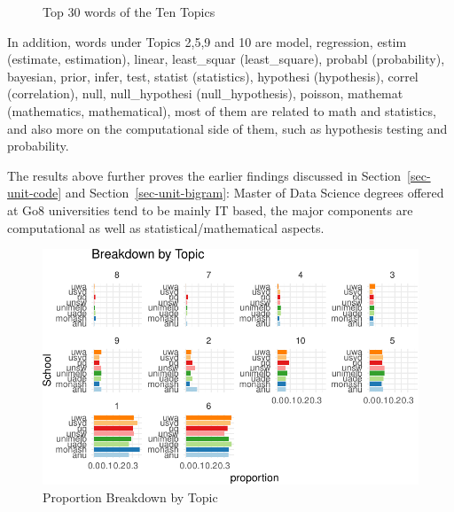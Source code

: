 \documentclass[
  letterpaper,
]{report}
\begin{document}
\begin{figure}
{\begin{table}
\begin{tabular}{>{}l|>{}l|>{}l|>{}l|>{}l|>{}l|>{}l|>{}l|>{}l|>{}l}
\hline
\cellcolor[HTML]{A6CEE3}{\textcolor{white}{method}} & \cellcolor[HTML]{1F78B4}{\textcolor{white}{independ\_variabl}} & \cellcolor[HTML]{B2DF8A}{\textcolor{white}{differ}} & \cellcolor[HTML]{33A02C}{\textcolor{white}{pr}} & \cellcolor[HTML]{FB9A99}{\textcolor{white}{first}} & \cellcolor[HTML]{E31A1C}{\textcolor{white}{spatial}} & \cellcolor[HTML]{FDBF6F}{\textcolor{white}{random}} & \cellcolor[HTML]{FF7F00}{\textcolor{white}{w\_}} & \cellcolor[HTML]{CAB2D6}{\textcolor{white}{fals}} & \cellcolor[HTML]{6A3D9A}{\textcolor{white}{t\_}}\\
\hline
\end{tabular}
\endgroup{}
\end{table}

}

\caption{\label{fig-topics}Top 30 words of the Ten Topics}

\end{figure}

In addition, words under Topics 2,5,9 and 10 are model, regression,
estim (estimate, estimation), linear, least\_squar (least\_square),
probabl (probability), bayesian, prior, infer, test, statist
(statistics), hypothesi (hypothesis), correl (correlation), null,
null\_hypothesi (null\_hypothesis), poisson, mathemat (mathematics,
mathematical), most of them are related to math and statistics, and also
more on the computational side of them, such as hypothesis testing and
probability.

The results above further proves the earlier findings discussed in
Section~\ref{sec-unit-code} and Section~\ref{sec-unit-bigram}: Master of
Data Science degrees offered at Go8 universities tend to be mainly IT
based, the major components are computational as well as
statistical/mathematical aspects.

\begin{figure}

{\centering \includegraphics{./04_1-unilda_files/figure-pdf/fig-unitopics2-1.pdf}

}

\caption{\label{fig-unitopics2}Proportion Breakdown by Topic}

\end{figure}
\end{document}
